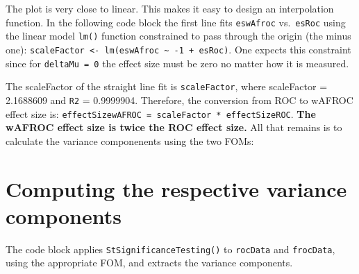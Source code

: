 \documentclass[]{book}
\newenvironment{Shaded}{\begin{snugshade}}{\end{snugshade}}
\newcommand{\CommentTok}[1]{\textcolor[rgb]{0.56,0.35,0.01}{\textit{#1}}}
\newcommand{\DataTypeTok}[1]{\textcolor[rgb]{0.13,0.29,0.53}{#1}}
\newcommand{\DecValTok}[1]{\textcolor[rgb]{0.00,0.00,0.81}{#1}}
\newcommand{\FloatTok}[1]{\textcolor[rgb]{0.00,0.00,0.81}{#1}}
\newcommand{\KeywordTok}[1]{\textcolor[rgb]{0.13,0.29,0.53}{\textbf{#1}}}
\newcommand{\NormalTok}[1]{#1}
\newcommand{\OperatorTok}[1]{\textcolor[rgb]{0.81,0.36,0.00}{\textbf{#1}}}
\newcommand{\StringTok}[1]{\textcolor[rgb]{0.31,0.60,0.02}{#1}}
\begin{document}
The plot is very close to linear. This makes it easy to design an interpolation function. In the following code block the first line fits \texttt{eswAfroc} vs.~\texttt{esRoc} using the linear model \texttt{lm()} function constrained to pass through the origin (the minus one): \texttt{scaleFactor\ \textless{}-\ lm(eswAfroc\ \textasciitilde{}\ -1\ +\ esRoc)}. One expects this constraint since for \texttt{deltaMu\ =\ 0} the effect size must be zero no matter how it is measured.

\begin{Shaded}
\end{Shaded}

The scaleFactor of the straight line fit is \texttt{scaleFactor}, where scaleFactor = 2.1688609 and \texttt{R2} = 0.9999904. Therefore, the conversion from ROC to wAFROC effect size is: \texttt{effectSizewAFROC\ =\ scaleFactor\ *\ effectSizeROC}. \textbf{The wAFROC effect size is twice the ROC effect size.} All that remains is to calculate the variance componenents using the two FOMs:

\hypertarget{computing-the-respective-variance-components}{%
\section{Computing the respective variance components}\label{computing-the-respective-variance-components}}

The code block applies \texttt{StSignificanceTesting()} to \texttt{rocData} and \texttt{frocData}, using the appropriate FOM, and extracts the variance components.

\begin{Shaded}
\end{Shaded}
\end{document}
